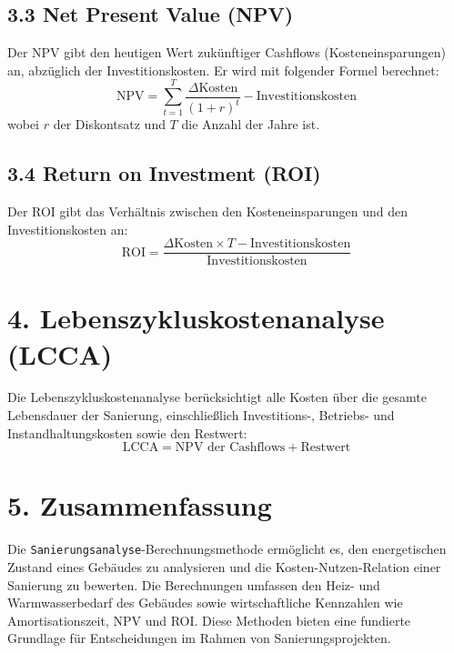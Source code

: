 \documentclass{article}
\begin{document}
\subsection*{3.3 Net Present Value (NPV)}
Der NPV gibt den heutigen Wert zukünftiger Cashflows (Kosteneinsparungen) an, abzüglich der Investitionskosten. Er wird mit folgender Formel berechnet:
\[
\text{NPV} = \sum_{t=1}^{T} \frac{\Delta \text{Kosten}}{(1 + r)^t} - \text{Investitionskosten}
\]
wobei \( r \) der Diskontsatz und \( T \) die Anzahl der Jahre ist.

\subsection*{3.4 Return on Investment (ROI)}
Der ROI gibt das Verhältnis zwischen den Kosteneinsparungen und den Investitionskosten an:
\[
\text{ROI} = \frac{\Delta \text{Kosten} \times T - \text{Investitionskosten}}{\text{Investitionskosten}}
\]

\section*{4. Lebenszykluskostenanalyse (LCCA)}
Die Lebenszykluskostenanalyse berücksichtigt alle Kosten über die gesamte Lebensdauer der Sanierung, einschließlich Investitions-, Betriebs- und Instandhaltungskosten sowie den Restwert:
\[
\text{LCCA} = \text{NPV der Cashflows} + \text{Restwert}
\]

\section*{5. Zusammenfassung}
Die \texttt{Sanierungsanalyse}-Berechnungsmethode ermöglicht es, den energetischen Zustand eines Gebäudes zu analysieren und die Kosten-Nutzen-Relation einer Sanierung zu bewerten. Die Berechnungen umfassen den Heiz- und Warmwasserbedarf des Gebäudes sowie wirtschaftliche Kennzahlen wie Amortisationszeit, NPV und ROI. Diese Methoden bieten eine fundierte Grundlage für Entscheidungen im Rahmen von Sanierungsprojekten.
\end{document}
